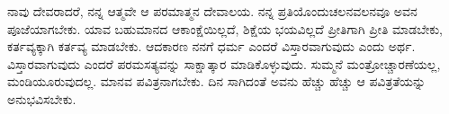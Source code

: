 ನಾವು ದೇವರಾದರೆ, ನನ್ನ ಆತ್ಮವೇ ಆ ಪರಮಾತ್ಮನ ದೇವಾಲಯ. ನನ್ನ ಪ್ರತಿಯೊಂದು\break ಚಲನವಲನವೂ ಅವನ ಪೂಜೆಯಾಗಬೇಕು. ಯಾವ ಬಹುಮಾನದ ಆಕಾಂಕ್ಷೆಯಿಲ್ಲದೆ, ಶಿಕ್ಷೆಯ ಭಯವಿಲ್ಲದೆ ಪ್ರೀತಿಗಾಗಿ ಪ್ರೀತಿ ಮಾಡಬೇಕು, ಕರ್ತವ್ಯಕ್ಕಾಗಿ ಕರ್ತವ್ಯ ಮಾಡಬೇಕು. ಆದಕಾರಣ ನನಗೆ ಧರ್ಮ ಎಂದರೆ ವಿಸ್ತಾರವಾಗುವುದು ಎಂದು ಅರ್ಥ. ವಿಸ್ತಾರವಾಗುವುದು ಎಂದರೆ ಪರಮಸತ್ಯವನ್ನು ಸಾಕ್ಷಾತ್ಕಾರ ಮಾಡಿಕೊಳ್ಳುವುದು. ಸುಮ್ಮನೆ ಮಂತ್ರೋಚ್ಚಾರಣೆಯಲ್ಲ, ಮಂಡಿಯೂರುವುದಲ್ಲ. ಮಾನವ ಪವಿತ್ರನಾಗಬೇಕು. ದಿನ ಸಾಗಿದಂತೆ ಅವನು ಹೆಚ್ಚು ಹೆಚ್ಚು ಆ ಪವಿತ್ರತೆಯನ್ನು ಅನುಭವಿಸಬೇಕು.

